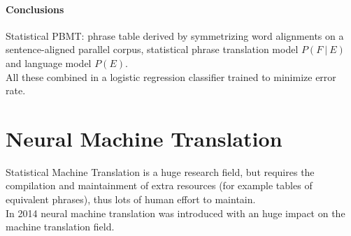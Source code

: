 \documentclass[10pt]{report}
\begin{document}
\paragraph{Conclusions} Statistical PBMT: phrase table derived by symmetrizing word alignments on a sentence-aligned parallel corpus, statistical phrase translation model $P(F\:|\:E)$ and language model $P(E)$.\\
All these combined in a logistic regression classifier trained to minimize error rate.
\section{Neural Machine Translation}
Statistical Machine Translation is a huge research field, but requires the compilation and maintainment of extra resources (for example tables of equivalent phrases), thus lots of human effort to maintain.\\
In 2014 neural machine translation was introduced with an huge impact on the machine translation field.
\end{document}
